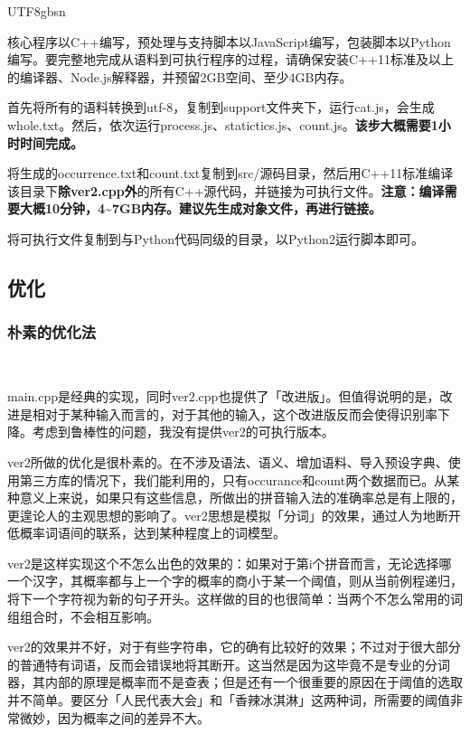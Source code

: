 \documentclass{article}
\newcommand{\tmstrong}[1]{\textbf{#1}}
\newenvironment{tmindent}{\begin{tmparmod}{1.5em}{0pt}{0pt}}{\end{tmparmod}}
\newenvironment{tmparmod}[3]{\begin{list}{}{\setlength{\topsep}{0pt}\setlength{\leftmargin}{#1}\setlength{\rightmargin}{#2}\setlength{\parindent}{#3}\setlength{\listparindent}{\parindent}\setlength{\itemindent}{\parindent}\setlength{\parsep}{\parskip}} \item[]}{\end{list}}
\begin{document}
\begin{CJK*}{UTF8}{gbsn}
\begin{tmindent}
  核心程序以C++编写，预处理与支持脚本以JavaScript编写，包装脚本以Python编写。要完整地完成从语料到可执行程序的过程，请确保安装C++11标准及以上的编译器、Node.js解释器，并预留2GB空间、至少4GB内存。
  
  首先将所有的语料转换到utf-8，复制到support文件夹下，运行cat.js，会生成whole.txt。然后，依次运行process.js、statictics.js、count.js。{\tmstrong{该步大概需要1小时时间完成。}}
  
  将生成的occurrence.txt和count.txt复制到src/源码目录，然后用C++11标准编译该目录下{\tmstrong{除ver2.cpp外}}的所有C++源代码，并链接为可执行文件。{\tmstrong{注意：编译需要大概10分钟，4\~{}7GB内存。建议先生成对象文件，再进行链接。}}
  
  将可执行文件复制到与Python代码同级的目录，以Python2运行脚本即可。
\end{tmindent}

\subsection{优化}

\subsubsection{朴素的优化法}

\begin{tmindent}
  \
  
  main.cpp是经典的实现，同时ver2.cpp也提供了「改进版」。但值得说明的是，改进是相对于某种输入而言的，对于其他的输入，这个改进版反而会使得识别率下降。考虑到鲁棒性的问题，我没有提供ver2的可执行版本。
  
  ver2所做的优化是很朴素的。在不涉及语法、语义、增加语料、导入预设字典、使用第三方库的情况下，我们能利用的，只有occurance和count两个数据而已。从某种意义上来说，如果只有这些信息，所做出的拼音输入法的准确率总是有上限的，更遑论人的主观思想的影响了。ver2思想是模拟「分词」的效果，通过人为地断开低概率词语间的联系，达到某种程度上的词模型。
  
  ver2是这样实现这个不怎么出色的效果的：如果对于第i个拼音而言，无论选择哪一个汉字，其概率都与上一个字的概率的商小于某一个阈值，则从当前例程递归，将下一个字符视为新的句子开头。这样做的目的也很简单：当两个不怎么常用的词组组合时，不会相互影响。
  
  ver2的效果并不好，对于有些字符串，它的确有比较好的效果；不过对于很大部分的普通特有词语，反而会错误地将其断开。这当然是因为这毕竟不是专业的分词器，其内部的原理是概率而不是查表；但是还有一个很重要的原因在于阈值的选取并不简单。要区分「人民代表大会」和「香辣冰淇淋」这两种词，所需要的阈值非常微妙，因为概率之间的差异不大。
  

\end{tmindent}
\end{CJK*}
\end{document}
